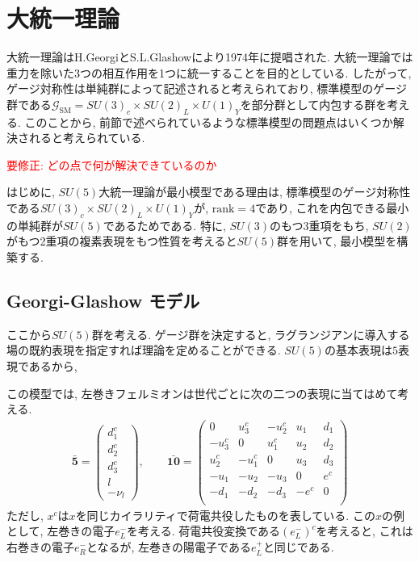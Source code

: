 \section{大統一理論}
大統一理論はH.GeorgiとS.L.Glashowにより1974年に提唱された\cite{PhysRevLett.32.438}.
大統一理論では重力を除いた3つの相互作用を1つに統一することを目的としている.
したがって, ゲージ対称性は単純群によって記述されると考えられており, 標準模型のゲージ群である$\mathcal{G}_\text{SM}= SU(3)_c\times SU(2)_L\times U(1)_Y$を部分群として内包する群を考える.
このことから, 前節で述べられているような標準模型の問題点はいくつか解決されると考えられている.

\textcolor{red}{要修正: どの点で何が解決できているのか}

はじめに, $SU(5)$大統一理論が最小模型である理由は, 標準模型のゲージ対称性である$SU(3)_c\times SU(2)_L\times U(1)_Y$が, $\text{rank}=4$であり, これを内包できる最小の単純群が$SU(5)$であるためである.
特に, $SU(3)$のもつ3重項をもち, $SU(2)$がもつ2重項の複素表現をもつ性質を考えると$SU(5)$群を用いて, 最小模型を構築する.


\subsection{Georgi-Glashow モデル}
ここから$SU(5)$群を考える.
ゲージ群を決定すると, ラグランジアンに導入する場の既約表現を指定すれば理論を定めることができる.
$SU(5)$の基本表現は$5$表現であるから, 

この模型では, 左巻きフェルミオンは世代ごとに次の二つの表現に当てはめて考える.
\begin{align}
 \bar{\bm{5}}=\begin{pmatrix}
    d_1 ^c \\
    d_2 ^c \\
    d_3 ^c \\
    l      \\
    -\nu_l
    \end{pmatrix},\qquad
\bar{\bm{10}}=\begin{pmatrix}
         0 &  u_3^c & -u_2^c & u_1 & d_1 \\
    -u_3^c &      0 &  u_1^c & u_2 & d_2 \\
     u_2^c & -u_1^c &      0 & u_3 & d_3 \\
    -u_1   &   -u_2 &   -u_3 &   0 & e^c \\
      -d_1 &   -d_2 &   -d_3 &-e^c &   0 \\
    \end{pmatrix}\label{GUT-1}
\end{align}
ただし, $x^c$は$x$を同じカイラリティで荷電共役したものを表している.
この$x$の例として, 左巻きの電子$e^-_L$を考える.
荷電共役変換である$(e^-_L)^c$を考えると, これは右巻きの電子$e_R^-$となるが, 左巻きの陽電子である$e_L^+$と同じである.


